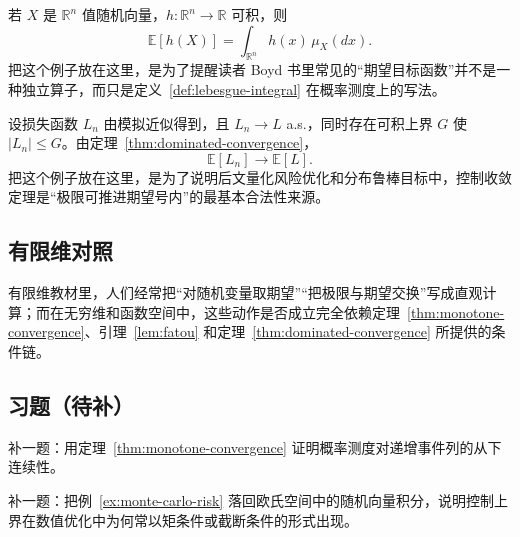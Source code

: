 \begin{example}\label{ex:finite-dimensional-expectation}
若 $X$ 是 $\mathbb R^n$ 值随机向量，$h\colon \mathbb R^n\to \mathbb R$ 可积，则
\[
\mathbb E[h(X)]=\int_{\mathbb R^n} h(x)\,\mu_X(dx).
\]
把这个例子放在这里，是为了提醒读者 Boyd 书里常见的“期望目标函数”并不是一种独立算子，而只是定义~\ref{def:lebesgue-integral} 在概率测度上的写法。
\end{example}

\begin{example}\label{ex:monte-carlo-risk}
设损失函数 $L_n$ 由模拟近似得到，且 $L_n\to L$ a.s.，同时存在可积上界 $G$ 使 $|L_n|\le G$。由定理~\ref{thm:dominated-convergence}，
\[
\mathbb E[L_n]\to \mathbb E[L].
\]
把这个例子放在这里，是为了说明后文量化风险优化和分布鲁棒目标中，控制收敛定理是“极限可推进期望号内”的最基本合法性来源。
\end{example}

\subsection*{有限维对照}

有限维教材里，人们经常把“对随机变量取期望”“把极限与期望交换”写成直观计算；而在无穷维和函数空间中，这些动作是否成立完全依赖定理~\ref{thm:monotone-convergence}、引理~\ref{lem:fatou} 和定理~\ref{thm:dominated-convergence} 所提供的条件链。

\subsection*{习题（待补）}

\begin{exercise}[单调收敛占位]\label{exr:monotone-convergence-placeholder}
补一题：用定理~\ref{thm:monotone-convergence} 证明概率测度对递增事件列的从下连续性。
\end{exercise}

\begin{exercise}[控制收敛桥接题占位]\label{exr:dominated-convergence-placeholder}
补一题：把例~\ref{ex:monte-carlo-risk} 落回欧氏空间中的随机向量积分，说明控制上界在数值优化中为何常以矩条件或截断条件的形式出现。
\end{exercise}
